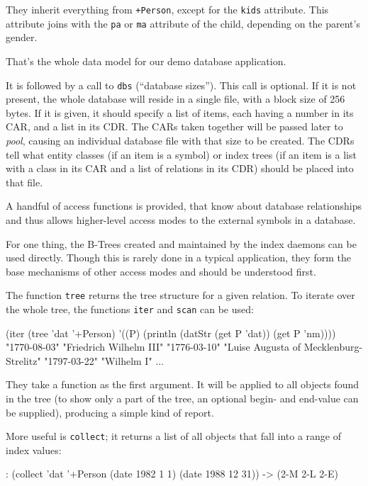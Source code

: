 They inherit everything from \texttt{+Person}, except for the \texttt{kids} attribute.
This attribute joins with the \texttt{pa} or \texttt{ma} attribute of the child,
depending on the parent's gender.

That's the whole data model for our demo database application.

It is followed by a call to \texttt{dbs} (``database sizes''). This call is
optional. If it is not present, the whole database will reside in a
single file, with a block size of 256 bytes. If it is given, it should
specify a list of items, each having a number in its CAR, and a list in
its CDR. The CARs taken together will be passed later to
\emph{pool}, causing an individual database file with that
size to be created. The CDRs tell what entity classes (if an item is a
symbol) or index trees (if an item is a list with a class in its CAR and
a list of relations in its CDR) should be placed into that file.

A handful of access functions is provided, that know about database
relationships and thus allows higher-level access modes to the external
symbols in a database.

For one thing, the B-Trees created and maintained by the index daemons
can be used directly. Though this is rarely done in a typical
application, they form the base mechanisms of other access modes and
should be understood first.

The function \texttt{tree} returns the tree structure for a given relation. To
iterate over the whole tree, the functions \texttt{iter} and \texttt{scan} can be
used:


\begin{wideverbatim}
(iter (tree 'dat '+Person) '((P) (println (datStr (get P 'dat)) (get P 'nm))))
"1770-08-03" "Friedrich Wilhelm III"
"1776-03-10" "Luise Augusta of Mecklenburg-Strelitz"
"1797-03-22" "Wilhelm I"
...
\end{wideverbatim}

They take a function as the first argument. It will be applied to all
objects found in the tree (to show only a part of the tree, an optional
begin- and end-value can be supplied), producing a simple kind of
report.

More useful is \texttt{collect}; it returns a list of all objects that fall
into a range of index values:


\begin{wideverbatim}
: (collect 'dat '+Person (date 1982 1 1) (date 1988 12 31))
-> ({2-M} {2-L} {2-E})
\end{wideverbatim}

